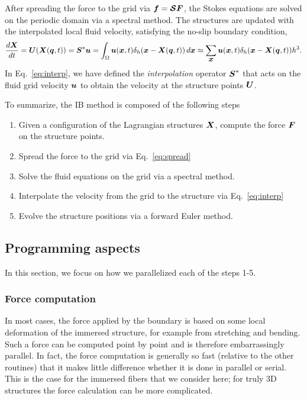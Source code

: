 \documentclass[]{article}
\newcommand{\bm}[1]{\mbox{\boldmath $ #1 $}}    %
\begin{document}
After spreading the force to the grid via $\bm{f}=\bm{\mathcal{S}}\bm{F}$, the Stokes equations are solved on the periodic domain via a spectral method. The structures are updated with the interpolated local fluid velocity, satisfying the no-slip boundary condition,
\begin{equation}
\label{eq:interp}
\frac{d \bm{X}}{dt} = \bm{U}(\bm{X}(\bm{q},t)) =\bm{S}^* \bm{u} = \int_{\Omega} \bm{u} (\bm{x},t) \delta_h(\bm{x}-\bm{X}(\bm{q},t))\, d\bm{x} \approx \sum_{\bm{x}} \bm{u}(\bm{x},t) \delta_h (\bm{x} - \bm{X}(\bm{q},t)) h^3. 
\end{equation}
In Eq.\ \eqref{eq:interp}, we have defined the \textit{interpolation} operator $\bm{S}^*$ that acts on the fluid grid velocity $\bm{u}$ to obtain the velocity at the structure points $\bm{U}$. 

To summarize, the IB method is composed of the following steps
\begin{enumerate}
\item Given a configuration of the Lagrangian structures $\bm{X}$, compute the force $\bm{F}$ on the structure points. 
\item Spread the force to the grid via Eq.\ \eqref{eq:spread}
\item Solve the fluid equations on the grid via a spectral method. 
\item Interpolate the velocity from the grid to the structure via Eq.\ \eqref{eq:interp}
\item Evolve the structure positions via a forward Euler method. 
\end{enumerate}

\subsection{Programming aspects}
In this section, we focus on how we parallelized each of the steps 1-5. 

\subsubsection{Force computation}
In most cases, the force applied by the boundary is based on some local deformation of the immersed structure, for example from stretching and bending. Such a force can be computed point by point and is therefore embarrassingly parallel. In fact, the force computation is generally so fast (relative to the other routines) that it makes little difference whether it is done in parallel or serial. This is the case for the immersed fibers that we consider here; for truly 3D structures the force calculation can be more complicated. 
\end{document}

